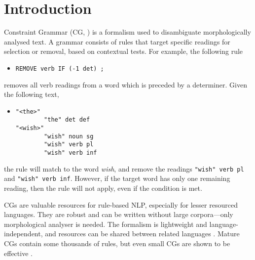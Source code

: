 \section{Introduction}
\label{sec:intro}



Constraint Grammar (CG, )
is a formalism used to disambiguate morphologically analysed text. 
A grammar consists of rules that target specific readings for selection or removal, based on contextual tests. For example, the following rule
\begin{itemize}
\item[] \texttt{REMOVE verb IF (-1 det) ;}
\end{itemize}
removes all verb readings from a word which is preceded by a determiner.
Given the following text,
\begin{itemize}
\item[] 
\begin{verbatim}
"<the>"
        "the" det def
"<wish>"
        "wish" noun sg
        "wish" verb pl
        "wish" verb inf
\end{verbatim}
\end{itemize}
the rule will match to the word \emph{wish}, and remove the readings
\texttt{"wish" verb pl} and \texttt{"wish" verb inf}.
However, if the target word has only one remaining reading, then the
rule will not apply, even if the condition is met.

CGs are valuable resources for rule-based NLP, especially for lesser
resourced languages. They are robust and can be written without large
corpora---only morphological analyser is needed. The formalism is
lightweight and language-independent, and resources can be shared
between related languages \cite{bick2006spanish,lene_trond_linda2010}.
Mature CGs contain some thousands of rules, but even small CGs are
shown to be effective \cite{lene_trond2011}.


